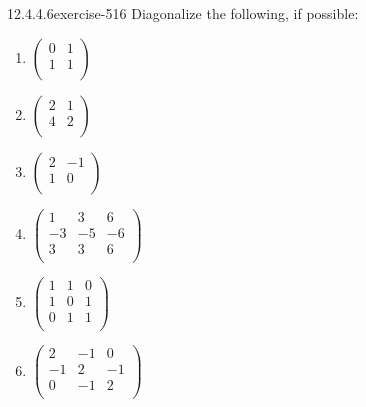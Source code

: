 \documentclass[twoside,10pt,]{book}
\numberwithin{equation}{section}
\begin{document}
\begin{divisionsolution}{12.4.4.6}{}{exercise-516}%
\hypertarget{p-4647}{}%
Diagonalize the following, if possible:\leavevmode%
\begin{multicols}{3}
\begin{enumerate}[label=(\alph*)]
\item\hypertarget{li-2124}{}\hypertarget{p-4648}{}%
\(\left(
\begin{array}{cc}
0 & 1 \\
1 & 1 \\
\end{array}
\right)\)%
\item\hypertarget{li-2125}{}\hypertarget{p-4649}{}%
\(\left(
\begin{array}{cc}
2 & 1 \\
4 & 2 \\
\end{array}
\right)\)%
\item\hypertarget{li-2126}{}\hypertarget{p-4650}{}%
\(\left(
\begin{array}{cc}
2 & -1 \\
1 & 0 \\
\end{array}
\right)\)%
\item\hypertarget{li-2127}{}\hypertarget{p-4651}{}%
\(\left(
\begin{array}{ccc}
1 & 3 & 6 \\
-3 & -5 & -6 \\
3 & 3 & 6 \\
\end{array}
\right)\)%
\item\hypertarget{li-2128}{}\hypertarget{p-4652}{}%
\(\left(
\begin{array}{ccc}
1 & 1 & 0 \\
1 & 0 & 1 \\
0 & 1 & 1 \\
\end{array}
\right)\)%
\item\hypertarget{li-2129}{}\hypertarget{p-4653}{}%
\(\left(
\begin{array}{ccc}
2 & -1 & 0 \\
-1 & 2 & -1 \\
0 & -1 & 2 \\
\end{array}
\right)\)%
\end{enumerate}
\end{multicols}
%
\end{divisionsolution}%
\end{document}
